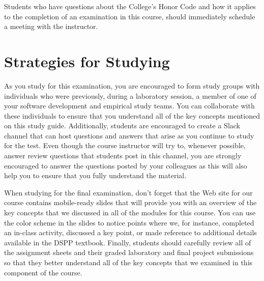 \noindent Students who have questions about the College's Honor Code and how it applies to the completion of an
examination in this course, should immediately schedule a meeting with the instructor.

\vspace*{-.2in}
\section*{Strategies for Studying}
\vspace*{-.1in}


As you study for this examination, you are encouraged to form study groups with individuals who were previously, during
a laboratory session, a member of one of your software development and empirical study teams. You can collaborate with
these individuals to ensure that you understand all of the key concepts mentioned on this study guide. Additionally,
students are encouraged to create a Slack channel that can host questions and answers that arise as you continue to
study for the test.  Even though the course instructor will try to, whenever possible, answer review questions that
students post in this channel, you are strongly encouraged to answer the questions posted by your colleagues as this
will also help you to ensure that you fully understand the material.

When studying for the final examination, don't forget that the Web site for our course contains mobile-ready slides that
will provide you with an overview of the key concepts that we discussed in all of the modules for this course. You can
use the color scheme in the slides to notice points where we, for instance, completed an in-class activity, discussed a
key point, or made reference to additional details available in the DSPP textbook. Finally, students should carefully
review all of the assignment sheets and their graded laboratory and final project submissions so that they better
understand all of the key concepts that we examined in this component of the course.


